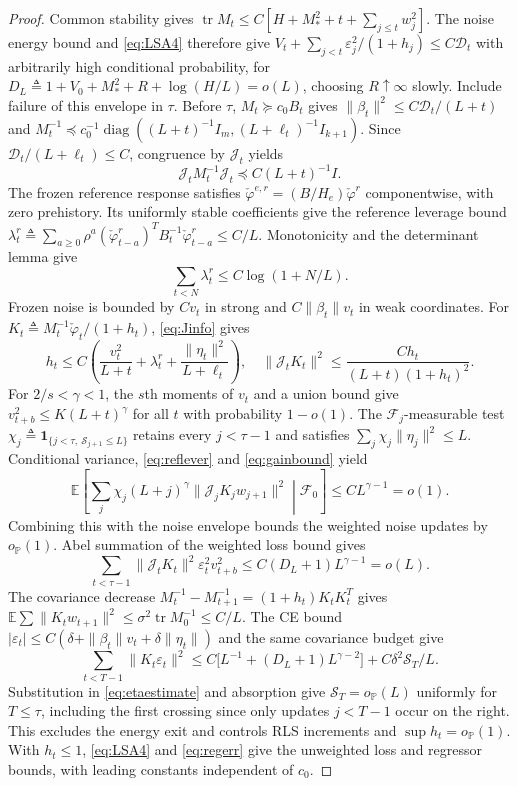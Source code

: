 \documentclass[11pt,reqno]{amsart}
\numberwithin{equation}{section}
\theoremstyle{definition}
\theoremstyle{remark}
\newcommand{\E}{\mathbb E}
\newcommand{\Prob}{\mathbb P}
\newcommand{\F}{\mathcal F}
\newcommand{\phc}{\check{\varphi}}
\newcommand{\tr}{\operatorname{tr}}
\newcommand{\diag}{\operatorname{diag}}
\newcommand{\ind}{\mathbf 1}
\begin{document}
\begin{proof}
Common stability gives $\tr M_t\le C[H+M_*^2+t+\sum_{j\le t}w_j^2]$. The noise energy bound and \eqref{eq:LSA4} therefore give
$V_t+\sum_{j<t}\varepsilon_j^2/(1+h_j)\le C\mathcal D_t$
with arbitrarily high conditional probability, for
$D_L\triangleq1+V_0+M_*^2+R+\log(H/L)=o(L)$, choosing $R\uparrow\infty$ slowly.
Include failure of this envelope in $\tau$.
Before $\tau$, $M_t\succeq c_0B_t$ gives
$\|\beta_t\|^2\le C\mathcal D_t/(L+t)$ and
$M_t^{-1}\preceq c_0^{-1}\diag((L+t)^{-1}I_m,(L+\ell_t)^{-1}I_{k+1})$.
Since $\mathcal D_t/(L+\ell_t)\le C$, congruence by $\mathcal J_t$ yields
\begin{equation}\label{eq:Jinfo}
 \mathcal J_tM_t^{-1}\mathcal J_t\preceq C(L+t)^{-1}I.
\end{equation}
The frozen reference response satisfies $\phc^{e,r}=(B/H_e)\phc^r$ componentwise, with zero prehistory. Its uniformly stable coefficients give the reference leverage bound
$\lambda_t^r\triangleq\sum_{a\ge0}\rho^a(\phc_{t-a}^r)^TB_t^{-1}\phc_{t-a}^r\le C/L$.
Monotonicity and the determinant lemma give
\begin{equation}\label{eq:reflever}
 \sum_{t<N}\lambda_t^r\le C\log(1+N/L).
\end{equation}
Frozen noise is bounded by $Cv_t$ in strong and $C\|\beta_t\|v_t$ in weak coordinates. For $K_t\triangleq M_t^{-1}\phc_t/(1+h_t)$, \eqref{eq:Jinfo} gives
\begin{equation}\label{eq:gainbound}
 h_t\le C\left(\frac{v_t^2}{L+t}+\lambda_t^r+
 \frac{\|\eta_t\|^2}{L+\ell_t}\right),\quad
 \|\mathcal J_tK_t\|^2\le\frac{C h_t}{(L+t)(1+h_t)^2}.
\end{equation}
For $2/s<\gamma<1$, the $s$th moments of $v_t$ and a union bound give
$v_{t+b}^2\le K(L+t)^\gamma$ for all $t$ with probability $1-o(1)$.
The $\F_j$-measurable test
$\chi_j\triangleq\ind_{\{j<\tau,\ \mathcal S_{j+1}\le L\}}$
retains every $j<\tau-1$ and satisfies $\sum_j\chi_j\|\eta_j\|^2\le L$.
Conditional variance, \eqref{eq:reflever} and \eqref{eq:gainbound} yield
\[
 \E\left[\sum_j\chi_j(L+j)^\gamma\|\mathcal J_jK_jw_{j+1}\|^2\middle|\F_0\right]
 \le CL^{\gamma-1}=o(1).
\]
Combining this with the noise envelope bounds the weighted noise updates by $o_{\Prob}(1)$. Abel summation of the weighted loss bound gives
\[
 \sum_{t<\tau-1}\|\mathcal J_tK_t\|^2\varepsilon_t^2v_{t+b}^2
 \le C(D_L+1)L^{\gamma-1}=o(L).
\]
The covariance decrease
$M_t^{-1}-M_{t+1}^{-1}=(1+h_t)K_tK_t^T$ gives
$\E\sum\|K_tw_{t+1}\|^2\le\sigma^2\tr M_0^{-1}\le C/L$.
The CE bound $|\varepsilon_t|\le C(\delta+\|\beta_t\|v_t+\delta\|\eta_t\|)$ and the same covariance budget give
\[
 \sum_{t<T-1}\|K_t\varepsilon_t\|^2
 \le C\bigl[L^{-1}+(D_L+1)L^{\gamma-2}\bigr]
 +C\delta^2\mathcal S_T/L.
\]
Substitution in \eqref{eq:etaestimate} and absorption give $\mathcal S_T=o_{\Prob}(L)$ uniformly for $T\le\tau$, including the first crossing since only updates $j<T-1$ occur on the right. This excludes the energy exit and controls RLS increments and $\sup h_t=o_{\Prob}(1)$. With $h_t\le1$, \eqref{eq:LSA4} and \eqref{eq:regerr} give the unweighted loss and regressor bounds, with leading constants independent of $c_0$.
\end{proof}
\end{document}
